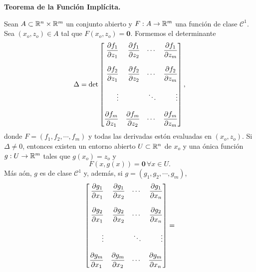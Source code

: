 \begin{theorem}\textbf{Teorema de la Funci\'on Impl\'icita.} \label{teo:implicit}
\mbox{}

 Sean $A \subset \mathbb{R}^n \times \mathbb{R}^m$ un conjunto abierto y $F: A \to \mathbb{R}^m$ una funci\'on de clase $\mathcal{C}^1$. Sea $(x_o,z_o) \in A$ tal que $F(x_o,z_o) = \mathbf{0}$. Formemos el determinante
 \[
  \Delta = \det \begin{bmatrix*}[r]
                \dif{f_1}{z_1} & \dif{f_1}{z_2} & \cdots & \dif{f_1}{z_m} \\
                               &                &        &                \\
                \dif{f_2}{z_1} & \dif{f_2}{z_2} & \cdots & \dif{f_2}{z_m} \\
                               &                &        &                \\
                \vdots         &                & \ddots & \vdots         \\
                               &                &        &                \\
                \dif{f_m}{z_1} & \dif{f_m}{z_2} & \cdots & \dif{f_m}{z_m}
                \end{bmatrix*},
 \]
 donde $F = (f_1, f_2, \cdots , f_m)$ y todas las derivadas est\'on evaluadas en $(x_o,z_o)$. Si $\Delta \ne 0$, entonces existen un entorno abierto $U \subset \mathbb{R}^n$ de $x_o$
 y una \'onica funci\'on $g: U \to \mathbb{R}^m$ tales que $g(x_o) = z_o$ y
 \[
  F(x,g(x)) = \mathbf{0} \, \forall x \in U.
 \]
 M\'as a\'on, $g$ es de clase $\mathcal{C}^1$ y, adem\'as, si $g = (g_1, g_2, \cdots , g_m)$,
 \[
  \begin{bmatrix*}[r]
                \dif{g_1}{x_1} & \dif{g_1}{x_2} & \cdots & \dif{g_1}{x_n} \\
                               &                &        &                \\
                \dif{g_2}{x_1} & \dif{g_2}{x_2} & \cdots & \dif{g_2}{x_n} \\
                               &                &        &                \\
                \vdots         &                & \ddots & \vdots         \\
                               &                &        &                \\
                \dif{g_m}{x_1} & \dif{g_m}{x_2} & \cdots & \dif{g_m}{x_n}
                \end{bmatrix*} =
\]
\end{theorem}
